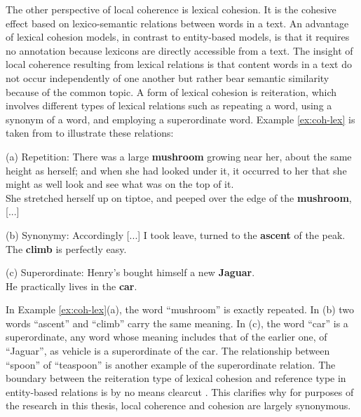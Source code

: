 The other perspective of local coherence is lexical cohesion. 
It is the cohesive effect based on \mbox{lexico-semantic} relations between words in a text. 
An advantage of lexical cohesion models, in contrast to \mbox{entity-based} models, is that it requires no annotation because lexicons are directly accessible from a text. 
The insight of local coherence resulting from lexical relations is that content words in a text do not occur independently of one another but rather bear semantic similarity because of the common topic. 
A form of lexical cohesion is reiteration, which involves different types of lexical relations such as repeating a word, using a synonym of a word, and employing a superordinate word. 
Example \ref{ex:coh-lex} is taken from  to illustrate these relations:

\begin{examples}
	\label{ex:coh-lex}
	(a) Repetition: There was a large \textbf{mushroom} growing near her, about the same height as herself; and when she had looked under it, it occurred to her that she might as well look and see what was on the top of it.\\
	She stretched herself up on tiptoe, and peeped over the edge of the \textbf{mushroom}, [...] 

	(b) Synonymy: Accordingly [...] I took leave, turned to the \textbf{ascent} of the peak. \\
	The \textbf{climb} is perfectly easy. 

	(c) Superordinate: Henry's bought himself a new \textbf{Jaguar}. \\
	He practically lives in the \textbf{car}. 

\end{examples} 

In Example \ref{ex:coh-lex}(a), the word ``mushroom'' is exactly repeated. 
In (b) two words ``ascent'' and ``climb'' carry the same meaning. 
In (c), the word ``car'' is a superordinate, any word whose meaning includes that of the earlier one, of ``Jaguar'', as vehicle is a superordinate of the car. 
The relationship between ``spoon'' of ``teaspoon'' is another example of the superordinate relation. 
The boundary between the reiteration type of lexical cohesion and reference type in entity-based relations is by no means clearcut
\cite{halliday76}. 
This clarifies why for purposes of the research in this thesis, local coherence and cohesion are largely synonymous.

